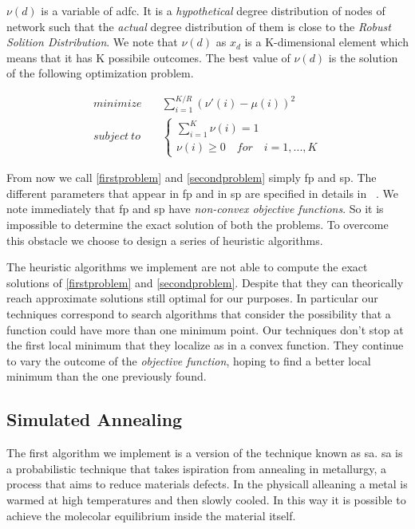 \documentclass[journal]{IEEEtran}
\begin{document}
$\nu(d)$ is a variable of \gls{adfc}. It is a \textit{hypothetical} degree distribution of nodes of network such that the \textit{actual} degree distribution of them is close to the \textit{Robust Solition Distribution}. We note that $\nu(d)$ as $x_d$ is a K-dimensional element which means that it has K possibile outcomes. The best value of $\nu(d)$ is the solution of the following optimization problem.

\begin{equation}
	\label{secondproblem}
	\begin{split}
		minimize & \quad \sum_{i=1}^{K/R}(\nu'(i)-\mu(i))^2 \\
		subject \ to & \quad \begin{cases}
			\sum_{i=1}^K \nu(i) = 1 \\
			\nu(i) \geq 0 \quad for \quad i=1,...,K
		\end{cases}
	\end{split}
\end{equation}

From now we call \eqref{firstproblem} and \eqref{secondproblem} simply \gls{fp} and \gls{sp}. The different parameters that appear in \gls{fp} and in \gls{sp} are specified in details in ~\cite{Lin2007}. We note immediately that \gls{fp} and \gls{sp} have \textit{non-convex objective functions}. So it is impossible to determine the exact solution of both the problems. To overcome this obstacle we choose to design a series of heuristic algorithms.

The heuristic algorithms we implement are not able to compute the exact solutions of \eqref{firstproblem} and \eqref{secondproblem}. Despite that they can theorically reach approximate solutions still optimal for our purposes. In particular our techniques correspond to search algorithms that consider the possibility that a function could have more than one minimum point. Our techniques don't stop at the first local minimum that they localize as in a convex function. They continue to vary the outcome of the \textit{objective function}, hoping to find a better local minimum than the one previously found.

\subsection{Simulated Annealing}

The first algorithm we implement is a version of the technique known as \gls{sa}. \gls{sa} is a probabilistic technique that takes ispiration from annealing in metallurgy, a process that aims to reduce materials defects. In the physicall alleaning a metal is warmed at high temperatures and then slowly cooled. In this way it is possible to achieve the molecolar equilibrium inside the material itself.
\end{document}
